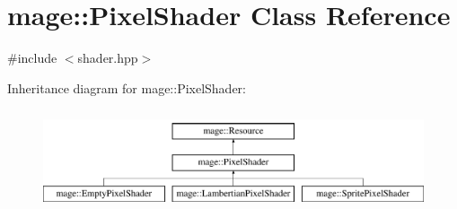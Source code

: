 \hypertarget{classmage_1_1_pixel_shader}{}\section{mage\+:\+:Pixel\+Shader Class Reference}
\label{classmage_1_1_pixel_shader}


{\ttfamily \#include $<$shader.\+hpp$>$}

Inheritance diagram for mage\+:\+:Pixel\+Shader\+:\begin{figure}[H]
\begin{center}
\leavevmode
\includegraphics[height=3.000000cm]{classmage_1_1_pixel_shader}
\end{center}
\end{figure}
